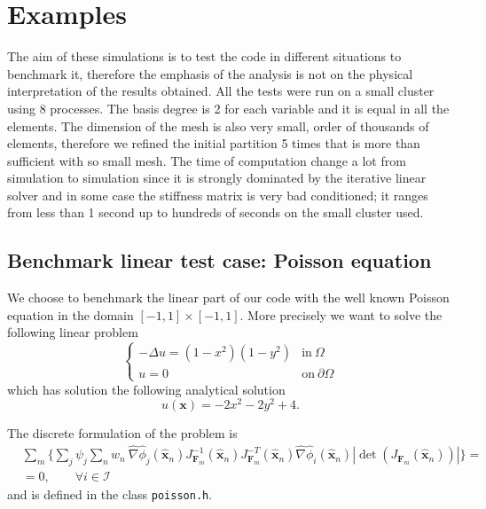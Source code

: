\section{Examples}\label{sec:exemples}
The aim of these simulations is to test the code in different situations to benchmark it, therefore the emphasis of the analysis is not on the physical interpretation of the results obtained. All the tests were run on a small cluster using 8 processes. The basis degree is 2 for each variable and it is equal in all the elements. The dimension of the mesh is also very small, order of thousands of elements, therefore we refined the initial partition 5 times that is more than sufficient with so small mesh. The time of computation change a lot from simulation to simulation since it is strongly dominated by the iterative linear solver and in some case the stiffness matrix is very bad conditioned; it ranges from less than 1 second up to hundreds of seconds on the small cluster used.

\subsection{Benchmark linear test case: Poisson equation}\label{subsec:ex_poisson}
We choose to benchmark the linear part of our code with the well known Poisson equation in the domain $[-1,1]\times[-1,1]$. More precisely we want to solve the following linear problem
\begin{equation}
  \begin{cases}
   -\Delta u=(1-x^2)(1-y^2)& \mathrm{in}\:\Omega\\
   u=0& \mathrm{on}\:\partial\Omega
  \end{cases}
\end{equation}
which has solution the following analytical solution
\begin{equation}
 u(\mathbf{x})=-2x^2-2y^2+4.
\end{equation}

The discrete formulation of the problem is
\begin{equation}
  \begin{split}
    &\sum_m \bigg\{\sum_j \psi_j \sum_n w_n\:\hat{\nabla}\hat{\phi}_j(\mathbf{\hat{x}}_n)J_{\mathbf{F}_m}^{-1}(\mathbf{\hat{x}}_n)J_{\mathbf{F}_m}^{-T}(\mathbf{\hat{x}}_n)\hat{\nabla}\hat{\phi}_i(\mathbf{\hat{x}}_n)|\det(J_{\mathbf{F}_m}(\mathbf{\hat{x}}_n))|\bigg\}=\\
    &=0, \qquad\forall i\in\mathcal{I}
  \end{split}
\end{equation}
and is defined in the class \verb|poisson.h|.
\medskip

